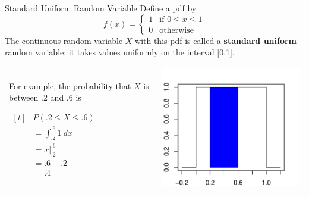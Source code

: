 \documentclass{beamer}
\renewcommand{\emph}{\textbf}
\begin{document}
\begin{frame}{Standard Uniform Random Variable}
Define a pdf by
$$f(x)=\begin{cases}1 & \text{if }0\leq x\leq 1 \\
0 & \text{otherwise}\end{cases}$$
The continuous random variable $X$ with this pdf is called a \emph{standard uniform} random variable; it takes values uniformly on the interval [0,1].
\begin{tabular}{@{}p{5.5cm}p{4.5cm}}
\vspace{0cm}For example, the probability that $X$ is between .2 and .6 is
\begin{center}$\begin{aligned}[t]
&P(.2 \leq X \leq .6) \\
&=\int_{.2}^{.6} 1\ dx\\
&= x\vert_{.2}^{.6}\\
&= .6-.2\\
&=.4
\end{aligned}$\end{center}
&
\vspace{0cm}\includegraphics[scale=.6]{ch4_pdf_unif.pdf}
\end{tabular}
\end{frame}
\end{document}
